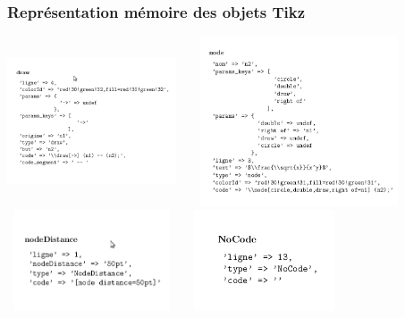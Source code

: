 \documentclass{beamer}
\begin{document}
\begin{frame}

\frametitle{Représentation mémoire des objets Tikz}

\includegraphics[width=5cm, height=5cm]{img/n3.png}
\includegraphics[width=7cm, height=5cm]{img/n2.png}\\
\centering
\includegraphics[width=5cm, height=3cm]{img/n1.png}
\includegraphics[width=5cm, height=3cm]{img/n4.png}
\end{frame}
\end{document}
